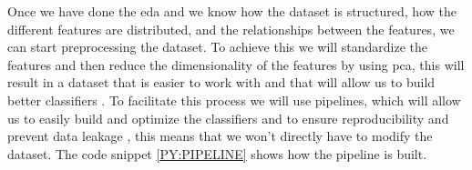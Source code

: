 Once we have done the \ac{eda} and we know how the dataset is structured, how the different features are distributed, and the relationships between the features, we can start preprocessing the dataset. To achieve this we will standardize the features and then reduce the dimensionality of the features by using \ac{pca}, this will result in a dataset that is easier to work with and that will allow us to build better classifiers \cite{dinc_evaluation_2014}. To facilitate this process we will use pipelines, which will allow us to easily build and optimize the classifiers and to ensure reproducibility and prevent data leakage \cite{zhao_pre-process_2019}, this means that we 
won't 
directly have to modify the dataset. The code snippet \ref{PY:PIPELINE} shows how the pipeline is built.


